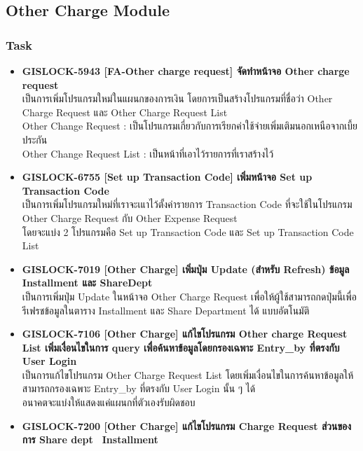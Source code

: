 \subsection{Other Charge Module}

\subsubsection{Task}
\begin{itemize}
    \setlength\itemsep{1em}
    \sloppy
    \item \textbf{{GISLOCK-5943 [FA-Other charge request] จัดทำหน้าจอ Other charge request}} \\
          เป็นการเพิ่มโปรแกรมใหม่ในแผนกของการเงิน โดยการเป็นสร้างโปรแกรมที่ชื่อว่า Other Charge Request และ Other Charge Request List\\
          Other Change Request : เป็นโปรแกรมเกี่ยวกับการเรียกค่าใช้จ่ายเพิ่มเติมนอกเหนือจากเบี้ยประกัน \\
          Other Change Request List : เป็นหน้าที่เอาไว้รายการที่เราสร้างไว้
    \item \textbf{{GISLOCK-6755 [Set up Transaction Code] เพิ่มหน้าจอ Set up Transaction Code}} \\
          เป็นการเพิ่มโปรแกรมใหม่ที่เราจะเแาไว้ตั้งค่ารายการ Transaction Code ที่จะใช้ในโปรแกรม Other Charge Request กับ Other Expense Request \\
          โดยจะแบ่ง 2 โปรแกรมคือ Set up Transaction Code และ Set up Transaction Code List 
    \item \textbf{{GISLOCK-7019 [Other Charge] เพิ่มปุ่ม Update (สำหรับ Refresh) ข้อมูล Installment และ ShareDept}} \\
          เป็นการเพิ่มปุ่ม Update ในหน้าจอ Other Charge Request เพื่อให้ผู้ใช้สามารถกดปุ่มนี้เพื่อรีเฟรชข้อมูลในตาราง Installment และ Share Department ได้ แบบอัตโนมัติ
    \item \textbf{{GISLOCK-7106 [Other Charge] แก้ไขโปรแกรม Other charge Request List เพิ่มเงื่อนไขในการ query เพื่อค้นหาข้อมูลโดยกรองเฉพาะ Entry\_by ที่ตรงกับ User Login}} \\
          เป็นการแก้ไขโปรแกรม Other Charge Request List โดยเพิ่มเงื่อนไขในการค้นหาข้อมูลให้สามารถกรองเฉพาะ Entry\_by ที่ตรงกับ User Login นั้น ๆ ได้ \\
          อนาคตจะแบ่งให้แสดงแค่แผนกที่ตัวเองรับผิดชอบ
    \item \textbf{{GISLOCK-7200 [Other Charge] แก้ไขโปรแกรม Charge Request ส่วนของการ Share dept \, Installment}} \\

\end{itemize}
